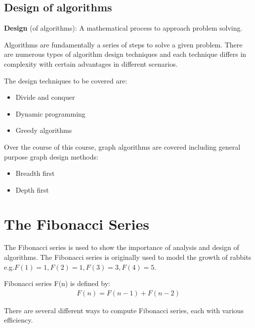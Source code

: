 \documentclass[10pt,a4paper]{article}
\begin{document}
\pagebreak

\subsection{Design of algorithms}

\begin{tcolorbox}[breakable,colback=white]
\textbf{Design} (of algorithms): A mathematical process to approach problem solving.
\end{tcolorbox}

Algorithms are fundamentally a series of steps to solve a given problem. There
are numerous types of algorithm design techniques and each technique diﬀers
in complexity with certain advantages in diﬀerent scenarios.

The design techniques to be covered are:
\begin{itemize}
    \item Divide and conquer
    \item Dynamic programming
    \item Greedy algorithms
\end{itemize}

Over the course of this course, graph algorithms are covered including general
purpose graph design methods:
\begin{itemize}
    \item Breadth ﬁrst
    \item Depth ﬁrst
\end{itemize}

\pagebreak

\section{The Fibonacci Series}

The Fibonacci series is used to show the importance of analysis and design
of algorithms. The Fibonacci series is originally used to model the growth of
rabbits e.g.$ F(1) = 1, F(2) = 1, F(3) = 3, F(4) = 5$.

Fibonacci series F(n) is deﬁned by:
\begin{align*}
    F(n) = F(n - 1) + F(n - 2)
\end{align*}

There are several diﬀerent ways to compute Fibonacci series, each with various
eﬃciency.
\end{document}
